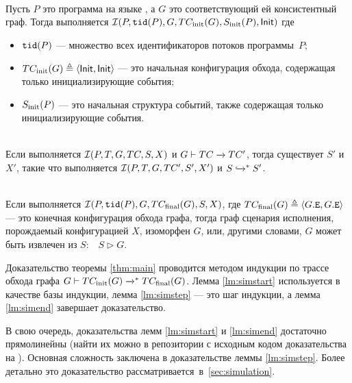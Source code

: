 \begin{lemma}
  \label{lm:simstart}
  \quad\\
  Пусть $P$ это программа на языке \LLANG,
  а $G$ это соответствующий ей \IMM консистентный граф.
  Тогда выполняется $\mathcal{I}(P, {\mathtt{tid}}(P), G, TC_{\mathrm{init}}({G}), S_{\rm init}(P), {\mathsf{Init}})$ где
  \begin{itemize}
    \item ${\mathtt{tid}}(P)$ --- множество всех идентификаторов потоков программы~$P$;
    \item $TC_{\mathrm{init}}({G}) \triangleq \langle {\mathsf{Init}}, {\mathsf{Init}} \rangle$ --- это начальная конфигурация обхода,
      содержащая только инициализирующие события;
    \item $S_{\rm init}(P)$ --- это начальная структура событий,
      также содержащая только инициализирующие события.
  \end{itemize}
\end{lemma}

\begin{lemma}
  \label{lm:simstep}
  \quad\\
  Если выполняется $\mathcal{I}(P, T, G, TC, S, X)$ и ${G \vdash TC \xrightarrow{} TC'}$,
  тогда существует $S'$ и $X'$, такие что выполняется
  $\mathcal{I}(P, T, G, TC', S', X')$ и $S \xhookrightarrow{}^* S'$.
\end{lemma}

\begin{lemma}
  \label{lm:simend}
  \quad\\
  Если выполняется $\mathcal{I}(P, {\mathtt{tid}}(P), G, TC_{\mathrm{final}}({G}), S, X)$,
  где $TC_{\mathrm{final}}({G}) \triangleq \langle G.{\mathtt{E}}, G.{\mathtt{E}} \rangle$ --- это конечная
  конфигурация обхода графа, тогда граф сценария исполнения,
  порождаемый конфигурацией $X$, изоморфен $G$,
  или, другими словами, $G$ может быть извлечен из $S$:~~$S \rhd G$.
\end{lemma}

Доказательство теоремы \ref{thm:main}
проводится методом индукции по трассе обхода графа
$G \vdash TC_{\mathrm{init}}({G}) \xrightarrow{}^* TC_{\mathrm{final}}({G})$.
Лемма \ref{lm:simstart} используется в качестве базы индукции,
лемма \ref{lm:simstep} --- это шаг индукции,
а лемма \ref{lm:simend} завершает доказательство.

В свою очередь, доказательства лемм \ref{lm:simstart} и \ref{lm:simend}
достаточно прямолинейны (найти их можно в репозитории с исходным кодом доказательства на \coq).
Основная сложность заключена в доказательстве леммы \ref{lm:simstep}.
Более детально это доказательство рассматривается~в~\cref{sec:simulation}.

